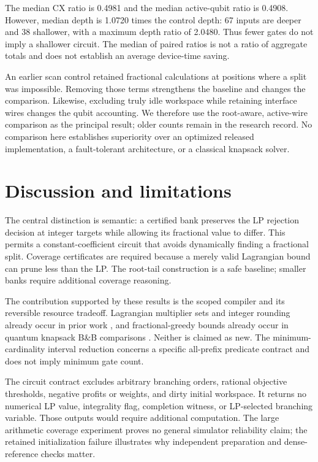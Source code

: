\documentclass[referee,pdflatex,sn-mathphys-num]{sn-jnl}
\theoremstyle{thmstyleone}
\theoremstyle{thmstyletwo}
\begin{document}
The median CX ratio is 0.4981 and the median active-qubit ratio is 0.4908. However, median depth is 1.0720 times the control depth: 67 inputs are deeper and 38 shallower, with a maximum depth ratio of 2.0480. Thus fewer gates do not imply a shallower circuit. The median of paired ratios is not a ratio of aggregate totals and does not establish an average device-time saving.

An earlier scan control retained fractional calculations at positions where a split was impossible. Removing those terms strengthens the baseline and changes the comparison. Likewise, excluding truly idle workspace while retaining interface wires changes the qubit accounting. We therefore use the root-aware, active-wire comparison as the principal result; older counts remain in the research record. No comparison here establishes superiority over an optimized released implementation, a fault-tolerant architecture, or a classical knapsack solver.

\section{Discussion and limitations}\label{sec:discussion}
The central distinction is semantic: a certified bank preserves the LP rejection decision at integer targets while allowing its fractional value to differ. This permits a constant-coefficient circuit that avoids dynamically finding a fractional split. Coverage certificates are required because a merely valid Lagrangian bound can prune less than the LP. The root-tail construction is a safe baseline; smaller banks require additional coverage reasoning.

The contribution supported by these results is the scoped compiler and its reversible resource tradeoff. Lagrangian multiplier sets and integer rounding already occur in prior work \cite{bozejko2026}, and fractional-greedy bounds already occur in quantum knapsack B\&B comparisons \cite{wilkening2025}. Neither is claimed as new. The minimum-cardinality interval reduction concerns a specific all-prefix predicate contract and does not imply minimum gate count.

The circuit contract excludes arbitrary branching orders, rational objective thresholds, negative profits or weights, and dirty initial workspace. It returns no numerical LP value, integrality flag, completion witness, or LP-selected branching variable. Those outputs would require additional computation. The large arithmetic coverage experiment proves no general simulator reliability claim; the retained initialization failure illustrates why independent preparation and dense-reference checks matter.
\end{document}
